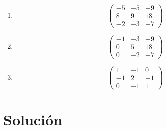 \documentclass{article}
\begin{document}
\begin{enumerate}[label=\textbf{\alph*)}]
    \item
    \[
    \begin{pmatrix}
        -5 & -5 & -9\\
        8 & 9 & 18\\
        -2 & -3 & -7
    \end{pmatrix}
    \]

    \item
    \[
    \begin{pmatrix}
        -1 & -3 & -9\\
        0 & 5 & 18\\
        0 & -2 & -7
    \end{pmatrix}
    \]

    \item
    \[
    \begin{pmatrix}
        1 & -1 & 0\\
        -1 & 2 & -1\\
        0 & -1 & 1
    \end{pmatrix}
    \]
\end{enumerate}


\newpage
\section*{Solución}
\end{document}
